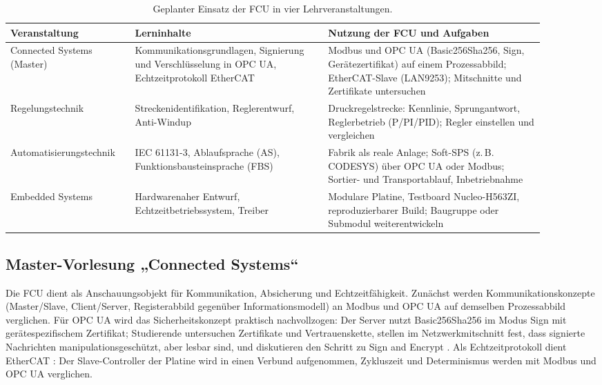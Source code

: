 \documentclass[]{article}%
\begin{document}
\begin{table}[htbp]
\centering
\small
\caption{Geplanter Einsatz der FCU in vier Lehrveranstaltungen.}
\label{tab:lehrveranstaltungen}
\begin{tabular}{p{0.20\linewidth}p{0.33\linewidth}p{0.37\linewidth}}
\toprule
\textbf{Veranstaltung} & \textbf{Lerninhalte} & \textbf{Nutzung der FCU und Aufgaben} \\
\midrule
Connected Systems (Master) & Kommunikationsgrundlagen, Signierung und Verschlüsselung in OPC UA, Echtzeitprotokoll EtherCAT & Modbus und OPC UA (Basic256Sha256, Sign, Gerätezertifikat) auf einem Prozessabbild; EtherCAT-Slave (LAN9253); Mitschnitte und Zertifikate untersuchen \\[2pt]
Regelungstechnik & Streckenidentifikation, Reglerentwurf, Anti-Windup & Druckregelstrecke: Kennlinie, Sprungantwort, Reglerbetrieb (P/PI/PID); Regler einstellen und vergleichen \\[2pt]
Automatisierungs\-technik & IEC 61131-3, Ablaufsprache (AS), Funktionsbausteinsprache (FBS) & Fabrik als reale Anlage; Soft-SPS (z.\,B. CODESYS) über OPC UA oder Modbus; Sortier- und Transportablauf, Inbetriebnahme \\[2pt]
Embedded Systems & Hardwarenaher Entwurf, Echtzeitbetriebssystem, Treiber & Modulare Platine, Testboard Nucleo-H563ZI, reproduzierbarer Build; Baugruppe oder Submodul weiterentwickeln \\
\bottomrule
\end{tabular}
\end{table}

\subsection{Master-Vorlesung „Connected Systems“}
Die FCU dient als Anschauungsobjekt für Kommunikation, Absicherung und Echtzeitfähigkeit. Zunächst werden Kommunikationskonzepte (Master/Slave, Client/Server, Registerabbild gegenüber Informationsmodell) an Modbus und OPC UA auf demselben Prozessabbild verglichen. Für OPC UA wird das Sicherheitskonzept praktisch nachvollzogen: Der Server nutzt Basic256Sha256 im Modus Sign mit gerätespezifischem Zertifikat; Studierende untersuchen Zertifikate und Vertrauenskette, stellen im Netzwerkmitschnitt fest, dass signierte Nachrichten manipulationsgeschützt, aber lesbar sind, und diskutieren den Schritt zu Sign and Encrypt \cite{iec62541}. Als Echtzeitprotokoll dient EtherCAT \cite{ethercat}: Der Slave-Controller der Platine wird in einen Verbund aufgenommen, Zykluszeit und Determinismus werden mit Modbus und OPC UA verglichen.
\end{document}

